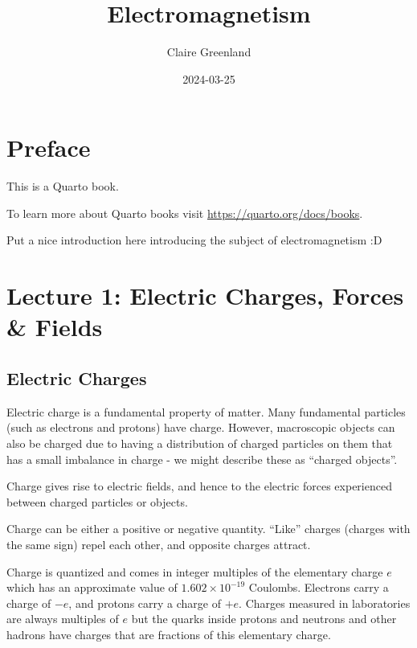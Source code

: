 \documentclass[
  letterpaper,
  DIV=11,
  numbers=noendperiod]{scrreprt}
\title{Electromagnetism}
\author{Claire Greenland}
\date{2024-03-25}
\renewcommand*\contentsname{Table of contents}
\newcommand\contentsname{Table of contents}
\begin{document}
\maketitle

\renewcommand*\contentsname{Table of contents}
{
\hypersetup{linkcolor=}
\setcounter{tocdepth}{2}
\tableofcontents
}

\chapter*{Preface}\label{preface}


This is a Quarto book.

To learn more about Quarto books visit
\url{https://quarto.org/docs/books}.

Put a nice introduction here introducing the subject of electromagnetism
:D


\chapter{Lecture 1: Electric Charges, Forces \&
Fields}\label{lecture-1-electric-charges-forces-fields}

\newcommand{\E}{\mathrm{\mathbf{E}}}
\newcommand{\F}{\mathrm{\mathbf{F}}}
\newcommand{\r}{\mathrm{\mathbf{r}}}

\section{Electric Charges}\label{electric-charges}

Electric charge is a fundamental property of matter. Many fundamental
particles (such as electrons and protons) have charge. However,
macroscopic objects can also be charged due to having a distribution of
charged particles on them that has a small imbalance in charge - we
might describe these as ``charged objects''.

Charge gives rise to electric fields, and hence to the electric forces
experienced between charged particles or objects.

Charge can be either a positive or negative quantity. ``Like'' charges
(charges with the same sign) repel each other, and opposite charges
attract.

Charge is quantized and comes in integer multiples of the elementary
charge \(e\) which has an approximate value of
\(1.602 \times 10 ^{-19}\) Coulombs. Electrons carry a charge of \(-e\),
and protons carry a charge of \(+e\). Charges measured in laboratories
are always multiples of \(e\) but the quarks inside protons and neutrons
and other hadrons have charges that are fractions of this elementary
charge.
\end{document}
